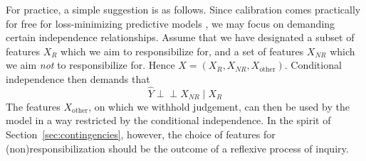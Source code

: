 \documentclass[11pt]{article} %
\newcommand{\indep}{\perp \!\!\! \perp}
\begin{document}
For practice, a simple suggestion is as follows. Since calibration comes practically for free for loss-minimizing predictive models \citep[p.\@\xspace 62f]{barocas-hardt-narayanan}, we may focus on demanding certain independence relationships. Assume that we have designated a subset of features $X_R$ which we aim to responsibilize for, and a set of features $X_{NR}$ which we aim \textit{not} to responsibilize for. Hence $X=(X_R,X_{NR},X_{\text{other}})$. Conditional independence \citep{castelnovo2022clarification} then demands that 
\begin{equation}
    \hat{Y} \indep X_{NR} \mid X_R
\end{equation}
The features $X_{\text{other}}$, on which we withhold judgement, can then be used by the model in a way restricted by the conditional independence.
In the spirit of Section~\ref{sec:contingencies}, however, the choice of features for (non)responsibilization should be the outcome of a reflexive process of inquiry.
\end{document}
